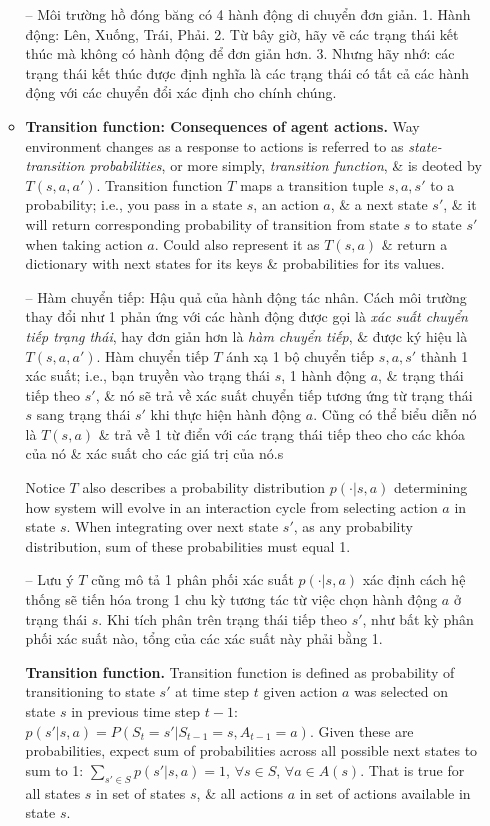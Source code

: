 \documentclass{article}
\begin{document}
\begin{itemize}
\begin{itemize}
        -- {\sf Môi trường hồ đóng băng có 4 hành động di chuyển đơn giản.} 1. Hành động: Lên, Xuống, Trái, Phải. 2. Từ bây giờ, hãy vẽ các trạng thái kết thúc mà không có hành động để đơn giản hơn. 3. Nhưng hãy nhớ: các trạng thái kết thúc được định nghĩa là các trạng thái có tất cả các hành động với các chuyển đổi xác định cho chính chúng.
        \item {\bf Transition function: Consequences of agent actions.} Way environment changes as a response to actions is referred to as {\it state-transition probabilities}, or more simply, {\it transition function}, \& is deoted by $T(s,a,a')$. Transition function $T$ maps a transition tuple $s,a,s'$ to a probability; i.e., you pass in a state $s$, an action $a$, \& a next state $s'$, \& it will return corresponding probability of transition from state $s$ to state $s'$ when taking action $a$. Could also represent it as $T(s,a)$ \& return a dictionary with next states for its keys \& probabilities for its values.

        -- {\sf Hàm chuyển tiếp: Hậu quả của hành động tác nhân.} Cách môi trường thay đổi như 1 phản ứng với các hành động được gọi là {\it xác suất chuyển tiếp trạng thái}, hay đơn giản hơn là {\it hàm chuyển tiếp}, \& được ký hiệu là $T(s,a,a')$. Hàm chuyển tiếp $T$ ánh xạ 1 bộ chuyển tiếp $s,a,s'$ thành 1 xác suất; i.e., bạn truyền vào trạng thái $s$, 1 hành động $a$, \& trạng thái tiếp theo $s'$, \& nó sẽ trả về xác suất chuyển tiếp tương ứng từ trạng thái $s$ sang trạng thái $s'$ khi thực hiện hành động $a$. Cũng có thể biểu diễn nó là $T(s,a)$ \& trả về 1 từ điển với các trạng thái tiếp theo cho các khóa của nó \& xác suất cho các giá trị của nó.s

        Notice $T$ also describes a probability distribution $p(\cdot|s,a)$ determining how system will evolve in an interaction cycle from selecting action $a$ in state $s$. When integrating over next state $s'$, as any probability distribution, sum of these probabilities must equal 1.

        -- Lưu ý $T$ cũng mô tả 1 phân phối xác suất $p(\cdot|s,a)$ xác định cách hệ thống sẽ tiến hóa trong 1 chu kỳ tương tác từ việc chọn hành động $a$ ở trạng thái $s$. Khi tích phân trên trạng thái tiếp theo $s'$, như bất kỳ phân phối xác suất nào, tổng của các xác suất này phải bằng 1.

        {\bf Transition function.} Transition function is defined as probability of transitioning to state $s'$ at time step $t$ given action $a$ was selected on state $s$ in previous time step $t - 1$: $p(s'|s,a) = P(S_t = s'|S_{t-1} = s,A_{t-1} = a)$. Given these are probabilities, expect sum of probabilities across all possible next states to sum to 1: $\sum_{s'\in S} p(s'|s,a) = 1$, $\forall s\in S$, $\forall a\in A(s)$. That is true for all states $s$ in set of states $s$, \& all actions $a$ in set of actions available in state $s$.


\end{itemize}
\end{itemize}
\end{document}
